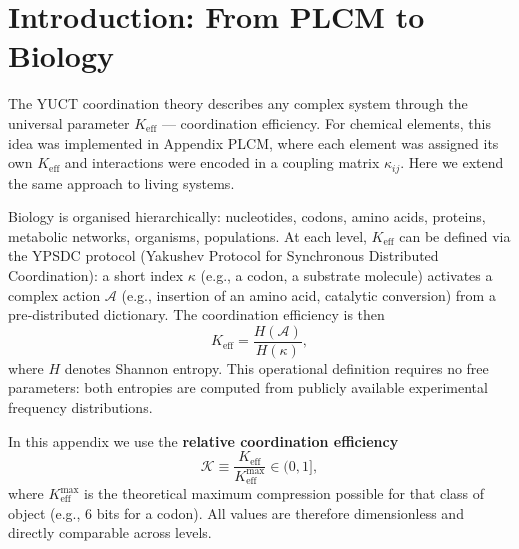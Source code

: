 \documentclass[12pt,a4paper]{article}
\newcommand{\REL}{\mathcal{K}}          %
\begin{document}
	\section{Introduction: From PLCM to Biology}
	The YUCT coordination theory describes any complex system through the universal parameter \(K_{\mathrm{eff}}\) — coordination efficiency. For chemical elements, this idea was implemented in Appendix PLCM, where each element was assigned its own \(K_{\mathrm{eff}}\) and interactions were encoded in a coupling matrix \(\kappa_{ij}\). Here we extend the same approach to living systems.
	
	Biology is organised hierarchically: nucleotides, codons, amino acids, proteins, metabolic networks, organisms, populations. At each level, \(K_{\mathrm{eff}}\) can be defined via the YPSDC protocol (Yakushev Protocol for Synchronous Distributed Coordination): a short index \(\kappa\) (e.g., a codon, a substrate molecule) activates a complex action \(\mathcal{A}\) (e.g., insertion of an amino acid, catalytic conversion) from a pre‑distributed dictionary. The coordination efficiency is then
	\[
	K_{\mathrm{eff}} = \frac{H(\mathcal{A})}{H(\kappa)},
	\]
	where \(H\) denotes Shannon entropy. This operational definition requires no free parameters: both entropies are computed from publicly available experimental frequency distributions.
	
	In this appendix we use the \textbf{relative coordination efficiency}
	\[
	\REL \equiv \frac{K_{\mathrm{eff}}}{K_{\mathrm{eff}}^{\max}} \in (0,1],
	\]
	where \(K_{\mathrm{eff}}^{\max}\) is the theoretical maximum compression possible for that class of object (e.g., 6 bits for a codon). All values are therefore dimensionless and directly comparable across levels.
	
\end{document}
